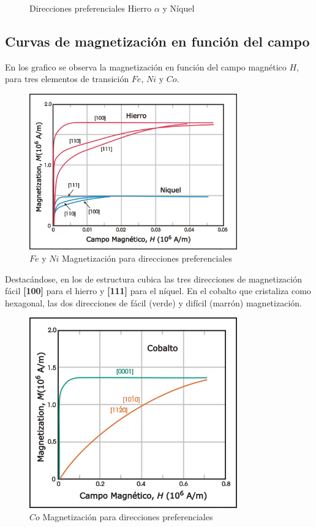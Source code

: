 \begin{figure}[H]
\begin{minipage}[b]{0.47\textwidth}
  \end{minipage}
  \caption{Direcciones preferenciales Hierro $\alpha$ y Níquel}
\end{figure}

\subsection{Curvas de magnetización en función del campo}

En los grafico se observa la magnetización en función del campo magnético $H$, para tres elementos de transición $Fe$, $Ni$ y $Co$.

\begin{figure}[H]
    \centering
    \includegraphics[width=0.8\textwidth]{./Figures/MagneticAnisotropy2}
	\caption{$Fe$ y $Ni$ Magnetización para direcciones preferenciales}
	\label{fig:MagneticAnisotropy2}
\end{figure}

Destacándose, en los de estructura cubica las tres direcciones de magnetización fácil \textbf{[100]} para el hierro y \textbf{[111]} para el níquel. En el cobalto que cristaliza como hexagonal, las dos direcciones de fácil (verde) y difícil (marrón) magnetización.

\begin{figure}[H]
    \centering
    \includegraphics[width=0.8\textwidth]{./Figures/MagneticAnisotropy1}
	\caption{$Co$ Magnetización para direcciones preferenciales}
	\label{fig:MagneticAnisotropy1}
\end{figure}


